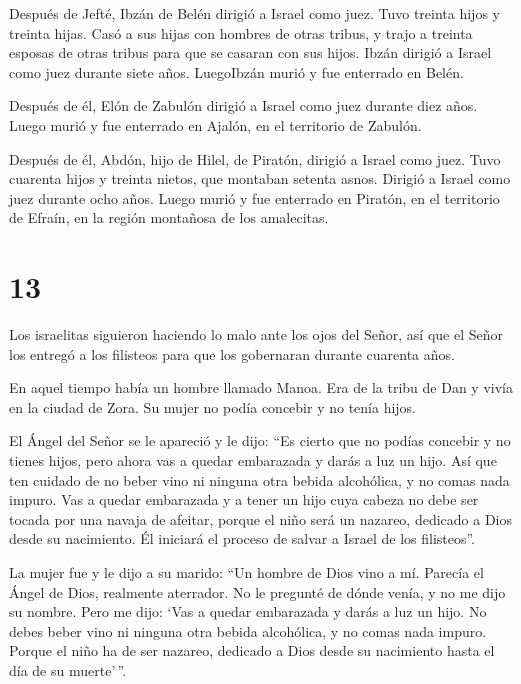  Después de Jefté, Ibzán de Belén dirigió a Israel como
juez.  Tuvo treinta hijos y treinta hijas. Casó a sus hijas
con hombres de otras tribus, y trajo a treinta esposas de otras tribus
para que se casaran con sus hijos. Ibzán dirigió a Israel como juez
durante siete años.  LuegoIbzán murió y fue enterrado en
Belén.

 Después de él, Elón de Zabulón dirigió a Israel como juez
durante diez años.  Luego murió y fue enterrado en Ajalón,
en el territorio de Zabulón.

 Después de él, Abdón, hijo de Hilel, de Piratón, dirigió a
Israel como juez.  Tuvo cuarenta hijos y treinta nietos,
que montaban setenta asnos. Dirigió a Israel como juez durante ocho
años.  Luego murió y fue enterrado en Piratón, en el
territorio de Efraín, en la región montañosa de los amalecitas.

\hypertarget{section-12}{%
\section{13}\label{section-12}}

 Los israelitas siguieron haciendo lo malo ante los ojos del
Señor, así que el Señor los entregó a los filisteos para que los
gobernaran durante cuarenta años.

 En aquel tiempo había un hombre llamado Manoa. Era de la
tribu de Dan y vivía en la ciudad de Zora. Su mujer no podía concebir y
no tenía hijos.

 El Ángel del Señor se le apareció y le dijo: ``Es cierto
que no podías concebir y no tienes hijos, pero ahora vas a quedar
embarazada y darás a luz un hijo.  Así que ten cuidado de no
beber vino ni ninguna otra bebida alcohólica, y no comas nada impuro.
 Vas a quedar embarazada y a tener un hijo cuya cabeza no
debe ser tocada por una navaja de afeitar, porque el niño será un
nazareo, dedicado a Dios desde su nacimiento. Él iniciará el proceso de
salvar a Israel de los filisteos''.

 La mujer fue y le dijo a su marido: ``Un hombre de Dios
vino a mí. Parecía el Ángel de Dios, realmente aterrador. No le pregunté
de dónde venía, y no me dijo su nombre.  Pero me dijo: `Vas
a quedar embarazada y darás a luz un hijo. No debes beber vino ni
ninguna otra bebida alcohólica, y no comas nada impuro. Porque el niño
ha de ser nazareo, dedicado a Dios desde su nacimiento hasta el día de
su muerte'\,''.

